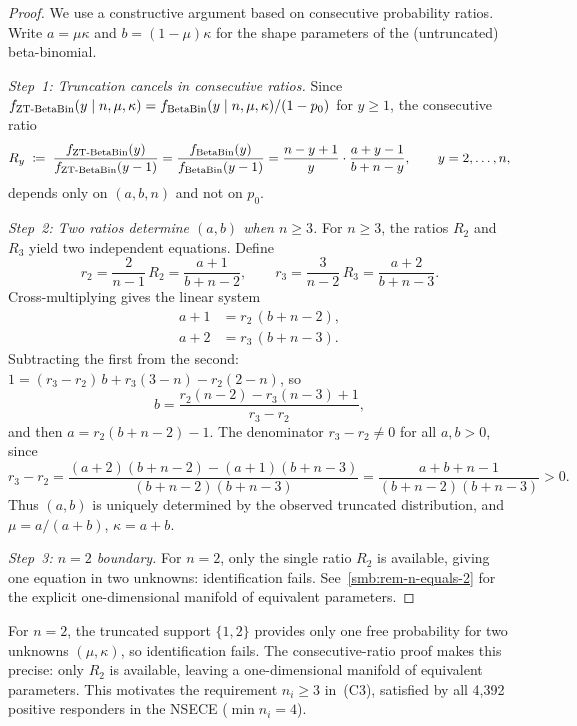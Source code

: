 \begin{proof}
  We use a constructive argument based on consecutive probability ratios.
  Write $a = \mu\kappa$ and $b = (1-\mu)\kappa$ for the shape parameters
  of the (untruncated) beta-binomial.

  \medskip\noindent\textit{Step~1: Truncation cancels in consecutive
  ratios.}\enspace
  Since $f_{\operatorname{ZT\text{-}BetaBin}}(y \mid n, \mu, \kappa) = f_{\operatorname{BetaBin}}(y \mid n,
  \mu, \kappa) / (1 - p_0)$ for $y \ge 1$, the consecutive ratio
  \[
    R_y \;\coloneqq\; \frac{f_{\operatorname{ZT\text{-}BetaBin}}(y)}{f_{\operatorname{ZT\text{-}BetaBin}}(y-1)}
    = \frac{f_{\operatorname{BetaBin}}(y)}{f_{\operatorname{BetaBin}}(y-1)}
    = \frac{n - y + 1}{y}\cdot\frac{a + y - 1}{b + n - y},
    \qquad y = 2, \ldots, n,
  \]
  depends only on $(a, b, n)$ and not on $p_0$.

  \medskip\noindent\textit{Step~2: Two ratios determine $(a,b)$ when
  $n \ge 3$.}\enspace
  For $n \ge 3$, the ratios $R_2$ and $R_3$ yield two independent
  equations. Define
  \[
    r_2 = \frac{2}{n-1}\,R_2 = \frac{a + 1}{b + n - 2},
    \qquad
    r_3 = \frac{3}{n-2}\,R_3 = \frac{a + 2}{b + n - 3}.
  \]
  Cross-multiplying gives the linear system
  \begin{align*}
    a + 1 &= r_2\,(b + n - 2), \\
    a + 2 &= r_3\,(b + n - 3).
  \end{align*}
  Subtracting the first from the second:
  $1 = (r_3 - r_2)\,b + r_3(3 - n) - r_2(2 - n)$,
  so
  \begin{equation}\label{smb:eq-b-from-ratios}
    b = \frac{r_2(n-2) - r_3(n-3) + 1}{r_3 - r_2},
  \end{equation}
  and then $a = r_2(b + n - 2) - 1$. The denominator $r_3 - r_2 \ne 0$
  for all $a, b > 0$, since
  \[
    r_3 - r_2
    = \frac{(a+2)(b+n-2) - (a+1)(b+n-3)}{(b+n-2)(b+n-3)}
    = \frac{a + b + n - 1}{(b+n-2)(b+n-3)}
    > 0.
  \]
  Thus $(a, b)$ is uniquely determined by the observed truncated
  distribution, and $\mu = a/(a+b)$, $\kappa = a + b$.

  \medskip\noindent\textit{Step~3: $n = 2$ boundary.}\enspace
  For $n = 2$, only the single ratio $R_2$ is available, giving one
  equation in two unknowns: identification fails.
  See~\cref{smb:rem-n-equals-2} for the explicit one-dimensional
  manifold of equivalent parameters.
\end{proof}

\begin{remark}[The $n = 2$ boundary case]\label{smb:rem-n-equals-2}
  For $n = 2$, the truncated support $\{1, 2\}$ provides only one free
  probability for two unknowns $(\mu, \kappa)$, so identification fails.
  The consecutive-ratio proof makes this precise: only $R_2$ is available,
  leaving a one-dimensional manifold of equivalent parameters. This
  motivates the requirement $n_i \ge 3$ in~\textup{(C3)}, satisfied by
  all 4{,}392 positive responders in the NSECE ($\min n_i = 4$).
\end{remark}

